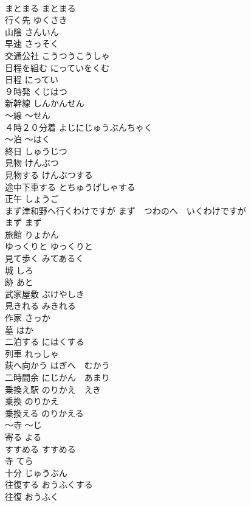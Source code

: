 \documentclass[8pt]{extreport}
\begin{document}
\begin{CJK}{UTF8}{min}
\\	まとまる	まとまる	
\\	行く先	ゆくさき	
\\	山陰	さんいん	
\\	早速	さっそく	
\\	交通公社	こうつうこうしゃ	
\\	日程を組む	にっていをくむ	
\\	日程	にってい	
\\	９時発	くじはつ	
\\	新幹線	しんかんせん	
\\	〜線	〜せん	
\\	４時２０分着	よじにじゅうぶんちゃく	
\\	〜泊	〜はく	
\\	終日	しゅうじつ	
\\	見物	けんぶつ	
\\	見物する	けんぶつする	
\\	途中下車する	とちゅうげしゃする	
\\	正午	しょうご	
\\	まず津和野へ行くわけですが	まず　つわのへ　いくわけですが	
\\	まず	まず	
\\	旅館	りょかん	
\\	ゆっくりと	ゆっくりと	
\\	見て歩く	みてあるく	
\\	城	しろ	
\\	跡	あと	
\\	武家屋敷	ぶけやしき	
\\	見きれる	みきれる	
\\	作家	さっか	
\\	墓	はか	
\\	二泊する	にはくする	
\\	列車	れっしゃ	
\\	萩へ向かう	はぎへ　むかう	
\\	二時間余	にじかん　あまり	
\\	乗換え駅	のりかえ　えき	
\\	乗換	のりかえ	
\\	乗換える	のりかえる	
\\	〜寺	〜じ	
\\	寄る	よる	
\\	すすめる	すすめる	
\\	寺	てら	
\\	十分	じゅうぶん	
\\	往復する	おうふくする	
\\	往復	おうふく	

\end{CJK}
\end{document}

